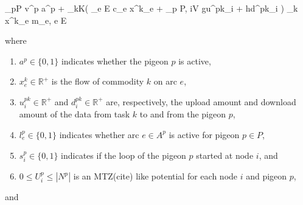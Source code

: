 \documentclass{article}
\begin{document}
	
	\begin{mini!}[3]
		{}
		{
			\sum_{p\in P} v^p a^p   +
			\sum_{k\in K}\left(
			\sum_{e \in E} c_e x^k_e + \sum_{p \in P, i\in V} gu^{pk}_{i} + hd^{pk}_{i}
			\right)
		}
		{}
		{}
		\addConstraint
			{\sum_{k} x^k_e \leq}
			{m_e,}
			{ \quad e \in E \label{eqs:land_const} }
	\end{mini!}
	where
	\begin{enumerate}
		\item $a^p \in \{0, 1\}$ indicates whether the pigeon $p$ is active,
		\item $x^k_e \in \mathbb{R}^+$ is the flow of commodity $k$ on arc $e$,
		\item $u^{pk}_i \in \mathbb{R}^+$ and $d^{pk}_i\in \mathbb{R}^+$ are, respectively, the upload amount and download amount of the data from task $k$ to and from the pigeon $p$,
		\item $l^p_e \in \{0, 1\}$ indicates whether arc $e \in A^p$ is active for pigeon $p \in P$,
		\item $s^p_i \in \{0, 1\}$ indicates if the loop of the pigeon $p$ started at node $i$, and
		\item $0 \leq U^p_i \leq |N^p|$ is an MTZ(cite) like potential for each node $i$ and pigeon $p$,
	\end{enumerate}
	and
\end{document}

